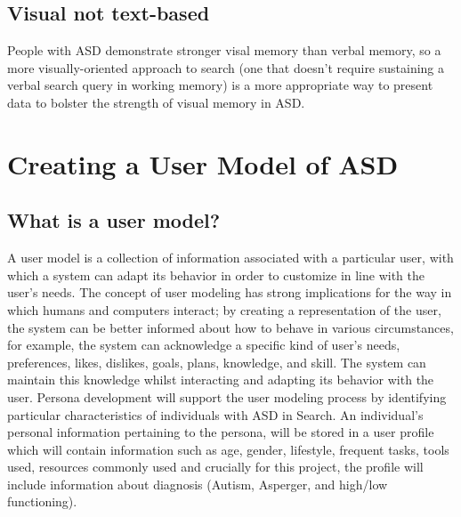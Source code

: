 \documentclass[10pt]{article}
\begin{document}
\subsection{Visual not text-based}
People with ASD demonstrate stronger visal memory \cite{fabienne} than verbal memory, so a more visually-oriented approach to search (one that doesn’t require sustaining a verbal search query in working memory) is a more appropriate way to present data to bolster the strength of visual memory in ASD.


\section {Creating a User Model of ASD}\label{usermodel}
\subsection{What is a user model?}
A user model is a collection of information associated with a particular user, with which a system can adapt its behavior in order to customize in line with the user’s needs. The concept of user modeling has strong implications for the way in which humans and computers interact; by creating a representation of the user, the system can be better informed about how to behave in various circumstances, for example, the system can acknowledge a specific kind of user’s needs, preferences, likes, dislikes, goals, plans, knowledge, and skill. The system can maintain this knowledge whilst interacting and adapting its behavior with the user.
Persona development will support the user modeling process by identifying particular characteristics of individuals with ASD in Search. An individual’s personal information pertaining to the persona, will be stored in a user profile which will contain information such as age, gender, lifestyle, frequent tasks, tools used, resources commonly used and crucially for this project, the profile will include information about diagnosis (Autism, Asperger, and high/low functioning).
\end{document}
